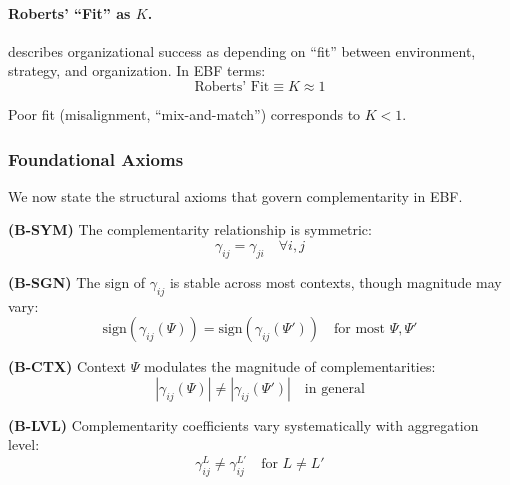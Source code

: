 \paragraph{Roberts' ``Fit'' as $K$.}
\citet{roberts2004} describes organizational success as depending on ``fit'' 
between environment, strategy, and organization. In EBF terms:
\begin{equation}
    \text{Roberts' Fit} \equiv K \approx 1
\end{equation}

Poor fit (misalignment, ``mix-and-match'') corresponds to $K < 1$.

\subsubsection{Foundational Axioms}

We now state the structural axioms that govern complementarity in EBF.

\begin{axiom}[Symmetry]
\label{ax:B-symmetry}
\textbf{(B-SYM)} The complementarity relationship is symmetric:
\begin{equation}
    \gamma_{ij} = \gamma_{ji} \quad \forall i, j
\end{equation}
\end{axiom}

\begin{axiom}
\label{ax:B-sign}
\textbf{(B-SGN)} The sign of $\gamma_{ij}$ is stable across most contexts, 
though magnitude may vary:
\begin{equation}
    \text{sign}(\gamma_{ij}(\Psi)) = \text{sign}(\gamma_{ij}(\Psi')) \quad 
    \text{for most } \Psi, \Psi'
\end{equation}
\end{axiom}

\begin{axiom}
\label{ax:B-context}
\textbf{(B-CTX)} Context $\Psi$ modulates the magnitude of complementarities:
\begin{equation}
    |\gamma_{ij}(\Psi)| \neq |\gamma_{ij}(\Psi')| \quad \text{in general}
\end{equation}
\end{axiom}

\begin{axiom}
\label{ax:B-level}
\textbf{(B-LVL)} Complementarity coefficients vary systematically with 
aggregation level:
\begin{equation}
    \gamma^L_{ij} \neq \gamma^{L'}_{ij} \quad \text{for } L \neq L'
\end{equation}
\end{axiom}

